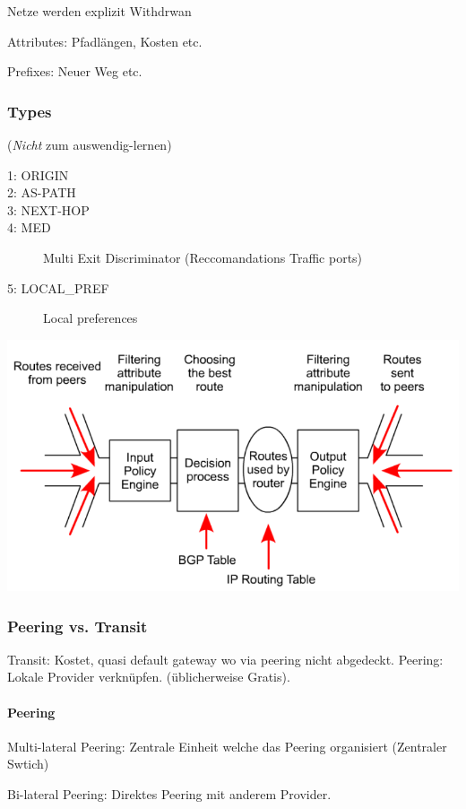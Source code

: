 Netze werden explizit Withdrwan

Attributes: Pfadlängen, Kosten etc.

Prefixes: Neuer Weg etc.

\subsubsection{Types}
(\emph{Nicht} zum auswendig-lernen)
\begin{description}
	\item[1: ORIGIN]
	\item[2: AS-PATH]
	\item[3: NEXT-HOP]
	\item[4: MED] Multi Exit Discriminator (Reccomandations Traffic ports)
	\item[5: LOCAL\_PREF] Local preferences
\end{description}

\includegraphics[width=0.5\linewidth]{img/bgp_process_model.png}

\subsubsection{Peering vs. Transit}

Transit: Kostet, quasi default gateway wo via peering nicht abgedeckt.
Peering: Lokale Provider verknüpfen. (üblicherweise Gratis).

\paragraph{Peering}
Multi-lateral Peering: Zentrale Einheit welche das Peering organisiert (Zentraler Swtich)

Bi-lateral Peering: Direktes Peering mit anderem Provider.



